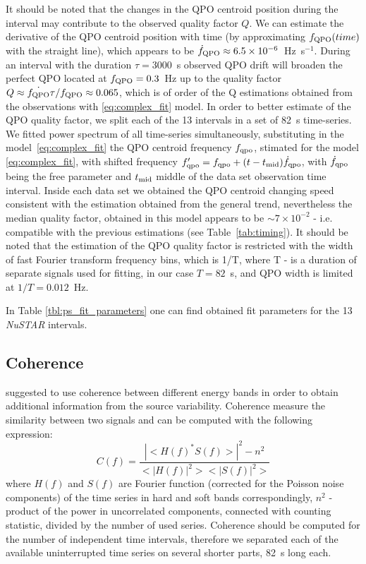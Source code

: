\documentclass[a4paper,fleqn,usenatbib]{mnras}
\begin{document}
It should be noted that the changes in the QPO centroid position during the interval may contribute to the observed quality factor $Q$.
We can estimate the derivative of the QPO centroid position with time (by approximating $f_{\rm QPO}(time)$ with the straight line), which appears to be $\dot{f}_{\rm QPO} \approx 6.5\times10^{-6}$~Hz~s$^{-1}$. 
During an interval with the duration $\tau = 3000$~s observed QPO drift will broaden the perfect QPO located at $f_{\rm QPO}=0.3$~Hz up to the quality factor $Q \approx \dot{f_{\rm QPO}}\tau/f_{\rm QPO} \approx 0.065$, which is of order of the Q estimations obtained from the observations with \ref{eq:complex_fit} model.
In order to better estimate of the QPO quality factor, we split each of the 13 intervals in a set of 82~s time-series. We fitted power spectrum of all time-series simultaneously,  substituting in the model~\ref{eq:complex_fit} the QPO centroid frequency $f_{\rm qpo}$, stimated for the model \ref{eq:complex_fit}, with shifted frequency $f_{\rm qpo}' = f_{\rm qpo} + (t - t_{\rm mid})\dot{f}_{\rm qpo}$, with $\dot{f}_{\rm qpo}$ being the free parameter and $t_{\rm mid}$ middle of the data set observation time interval. 
Inside each data set we obtained the QPO centroid changing speed consistent with the estimation obtained from the general trend, nevertheless the median quality factor, obtained in this model appears to be $\sim7\times10^{-2}$ - i.e. compatible with the previous estimations (see Table~\ref{tab:timing}). 
It should be noted that the estimation of the QPO quality factor is restricted with the width of fast Fourier transform frequency bins, which is 1/T, where T - is a duration of separate signals used for fitting, in our case $T=82$~s, and QPO width is limited at $1/T = 0.012$~Hz.


In Table \ref{tbl:ps_fit_parameters} one can find obtained fit parameters for the 13 {\it NuSTAR} intervals.

\subsection{Coherence}

\citep{1997ApJ...474L..43V} suggested to use coherence between different energy bands in order to obtain additional information from the source variability. 
Coherence measure the similarity between two signals and can be computed with the following expression:
\begin{equation}
    C(f) = \frac{|<H(f)^*S(f)>|^2 - n^2}{<|H(f)|^2><|S(f)|^2>}
    \label{eq:nowak_coh}
\end{equation}
where $H(f)$ and $S(f)$ are Fourier function (corrected for the Poisson noise components) of the time series in hard and soft bands correspondingly, 
$n^2$ - product of the power in uncorrelated components, connected with counting statistic, divided by the number of used series. 
Coherence should be computed for the number of independent time intervals, therefore we separated each of the available uninterrupted time series on several shorter parts, 82~s long each.  
\end{document}
